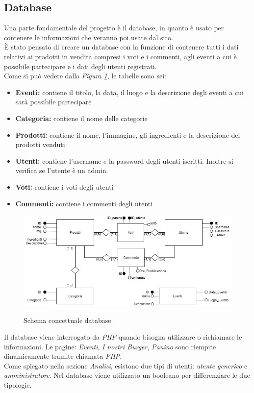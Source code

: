 \subsection{Database}
Una parte fondamentale del progetto è il database, in quanto è usato per contenere le informazioni che veranno poi usate dal sito.\\
È stato pensato di creare un database con la funzione di contenere tutti i dati relativi ai prodotti in vendita compresi i voti e i commenti, agli eventi a cui è possibile partecipare e i dati degli utenti registrati.\\
Come si può vedere dalla \emph{Figura \ref{Fig:schemadb}}, le tabelle sono sei:
\begin{itemize}
		\item \textbf{Eventi:} contiene il titolo, la data, il luogo e la descrizione degli eventi a cui sarà possibile partecipare
		\item \textbf{Categoria:} contiene il nome delle categorie
		\item \textbf{Prodotti:} contiene il nome, l'immagine, gli ingredienti e la descrizione dei prodotti venduti
		\item \textbf{Utenti:} contiene l'username e la password degli utenti iscritti. Inoltre si verifica se l'utente è un admin.
        \item \textbf{Voti:} contiene i voti degli utenti
        \item \textbf{Commenti:} contiene i commenti degli utenti
\end{itemize}
\begin{figure}[!h]
	\centering	%
	\includegraphics[width=0.7\linewidth]{../database/DiagrammaER.png}\\
    \caption{Schema concettuale database}
	\label{Fig:schemadb}
\end{figure}
Il database viene interrogato da \emph{PHP} quando bisogna utilizzare o richiamare le informazioni.
Le pagine: \emph{Eventi}, \emph{I nostri Burger}, \emph{Panino} sono riempite dinamicamente tramite chiamata \emph{PHP}.\\
Come spiegato nella sezione \emph{Analisi}, esistono due tipi di utenti: \emph{utente generico} e \emph{amministratore}. Nel database viene utilizzato un booleano per differenziare le due tipologie.\\ 